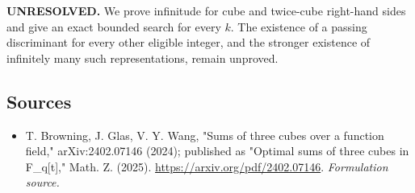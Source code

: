 \documentclass[11pt]{article}
\begin{document}
\textbf{UNRESOLVED.} We prove infinitude for cube and twice-cube right-hand sides and give an exact bounded search for every $k$. The existence of a passing discriminant for every other eligible integer, and the stronger existence of infinitely many such representations, remain unproved.

\subsection{Sources}
\begin{itemize}
\item[S1]T. Browning, J. Glas, V. Y. Wang, "Sums of three cubes over a function field," arXiv:2402.07146 (2024); published as "Optimal sums of three cubes in F\_q[t]," Math. Z. (2025).
\url{https://arxiv.org/pdf/2402.07146}.
\textit{Formulation source.}
\end{itemize}
\end{document}
